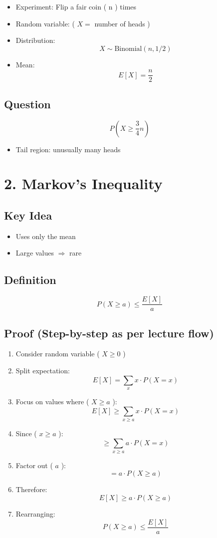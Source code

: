 \documentclass[11pt]{article}
\begin{document}
\begin{itemize}
\item Experiment: Flip a fair coin ( n ) times
\item Random variable: ( $X =$ number of heads )
\item Distribution:
\[
X \sim \text{Binomial}(n, 1/2)
\]
\item Mean:
\[
E[X] = \frac{n}{2}
\]
\end{itemize}

\subsection*{Question}

\[
P\left(X \ge \frac{3}{4}n\right)
\]

\begin{itemize}
\item Tail region: unusually many heads
\end{itemize}

\section*{2. Markov’s Inequality}

\subsection*{Key Idea}

\begin{itemize}
\item Uses only the mean
\item Large values $\Rightarrow$ rare
\end{itemize}

\subsection*{Definition}

\[
P(X \ge a) \le \frac{E[X]}{a}
\]

\subsection*{Proof (Step-by-step as per lecture flow)}

\begin{enumerate}
\item Consider random variable ( $X \ge 0$ )
\item Split expectation:
\[
E[X] = \sum_x x \cdot P(X = x)
\]
\item Focus on values where ( $X \ge a$ ):
\[
E[X] \ge \sum_{x \ge a} x \cdot P(X = x)
\]
\item Since ( $x \ge a$ ):
\[
\ge \sum_{x \ge a} a \cdot P(X = x)
\]
\item Factor out ( $a$ ):
\[
= a \cdot P(X \ge a)
\]
\item Therefore:
\[
E[X] \ge a \cdot P(X \ge a)
\]
\item Rearranging:
\[
P(X \ge a) \le \frac{E[X]}{a}
\]
\end{enumerate}
\end{document}
